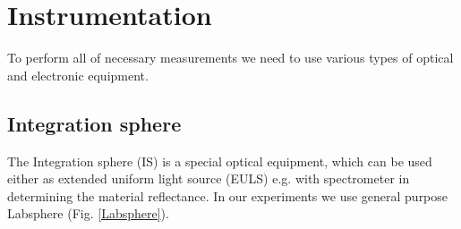 
\chapter{Instrumentation}
To perform all of necessary measurements we need to use various types of optical and electronic equipment.
\section{Integration sphere}
The Integration sphere (IS) is a special optical equipment, which can be used either as extended uniform light source (EULS) e.g. with spectrometer in determining the material reflectance. In our experiments we use general purpose Labsphere (Fig. \ref{Labsphere}).

